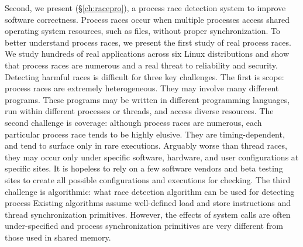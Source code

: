 Second, we present \racepro (\S\ref{ch:racepro}), a process race detection
system to improve software correctness. Process races occur when multiple
processes access shared operating system resources, such as files, without
proper synchronization.
To better understand process races, we present the first study of real process
races. We study hundreds of real applications across six Linux distributions and
show that process races are numerous and a real threat to reliability and
security. Detecting harmful races is difficult for three key challenges.
The first is scope: process races are extremely heterogeneous.  They may involve
many different programs.  These programs may be written in different programming
languages, run within different processes or threads, and access diverse
resources. The second challenge is coverage: although
process races are numerous, each particular process race tends to be highly
elusive.  They are timing-dependent, and tend to surface only in rare
executions. Arguably worse than thread races, they may occur only under
specific software, hardware, and user configurations at specific sites.  It is
hopeless to rely on a few software vendors and beta testing sites to create all
possible configurations and executions for checking.  The third challenge is
algorithmic: what race detection algorithm can be used for detecting process
Existing algorithms assume well-defined load and store instructions and thread
synchronization primitives. However, the effects of system calls are often
under-specified and process synchronization primitives are very different from
those used in shared memory.

